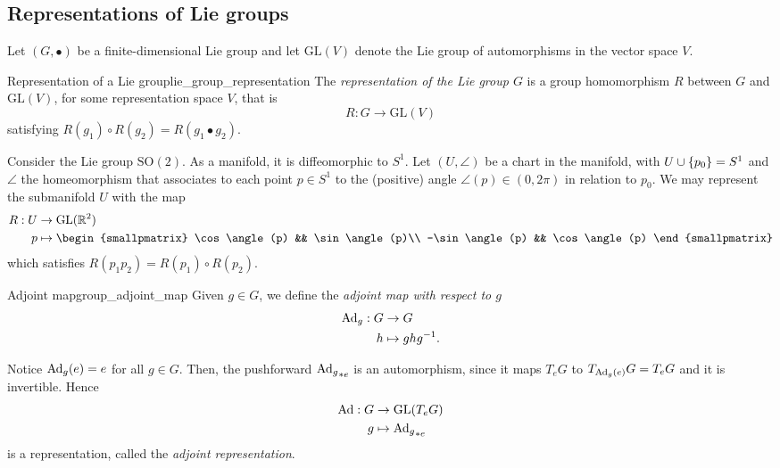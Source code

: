 \subsection{Representations of Lie groups}

Let \((G, \bullet)\) be a finite-dimensional Lie group and let \(\mathrm{GL}(V)\) denote the Lie group of automorphisms in the vector space \(V\).

\begin{definition}{Representation of a Lie group}{lie_group_representation}
    The \emph{representation of the Lie group \(G\)} is a group homomorphism \(R\) between \(G\) and \(\mathrm{GL}(V)\), for some representation space \(V\), that is
    \begin{equation*}
        R : G \to \mathrm{GL}(V)
    \end{equation*}
    satisfying \(R(g_1) \circ R(g_2) = R(g_1 \bullet g_2)\).
\end{definition}
\begin{example}
    Consider the Lie group \(\mathrm{SO}(2).\) As a manifold, it is diffeomorphic to \(S^1\). Let \((U, \angle)\) be a chart in the manifold, with \(U \cup \set{p_0} = S^1\) and \(\angle\) the homeomorphism that associates to each point \(p \in S^1\) to the (positive) angle \(\angle(p) \in (0, 2\pi)\) in relation to \(p_0\). We may represent the submanifold \(U\) with the map
    \begin{align*}
        R : U &\to \mathrm{GL}(\mathbb{R}^2)\\
            p &\mapsto \begin{smallpmatrix}
                  \cos \angle(p) && \sin\angle(p)\\
                  -\sin\angle(p) && \cos\angle(p)
              \end{smallpmatrix}
    \end{align*}
    which satisfies \(R(p_1 p_2) = R(p_1)\circ R(p_2).\)
\end{example}

\begin{definition}{Adjoint map}{group_adjoint_map}
    Given \(g \in G\), we define the \emph{adjoint map with respect to \(g\)}
    \begin{align*}
        \Ad{g} : G &\to G\\
                 h &\mapsto ghg^{-1}.
    \end{align*}
\end{definition}

Notice \(\Ad{g}(e) = e\) for all \(g \in G\). Then, the pushforward \(\pf[e]{\Ad{g}}\) is an automorphism, since it maps \(T_eG\) to \(T_{\Ad{g}(e)}G = T_eG\) and it is invertible. Hence
\begin{align*}
    \mathrm{Ad} : G &\to \mathrm{GL}(T_eG)\\
                  g &\mapsto \pf[e]{\Ad{g}}
\end{align*}
is a representation, called the \emph{adjoint representation}.
